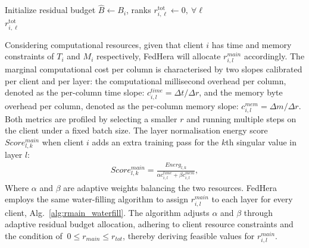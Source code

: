 \documentclass{article}
\begin{document}
\begin{algorithm}[tb]
\caption{Water-Filling for Download-side Rank Allocation $r^{\mathrm{tot}}_{i,\ell}$} \label{alg:rtot_waterfill}

Initialize residual budget $\widehat{B} \gets B_i$, ranks $r^{\mathrm{tot}}_{i,\ell} \gets 0,\ \forall \ell$ \\
\Return $r^{\mathrm{tot}}_{i,\ell}$
\end{algorithm}

Considering computational resources, given that client $i$ has time and memory constraints of $T_{i}$ and $M_{i}$ respectively, FedHera will allocate $r^{main}_{i, l}$ accordingly. The marginal computational cost per column is characterised by two slopes calibrated per client and per layer: the computational millisecond overhead per column, denoted as the per-column time slope: $c_{i,l}^{time} = \Delta t /\Delta r$, and the memory byte overhead per column, denoted as the per-column memory slope: $c_{i,l}^{mem} = \Delta m /\Delta r$. Both metrics are profiled by selecting a smaller $r$ and running multiple steps on the client under a fixed batch size. The layer normalisation energy score $Score_{l,k}^{main}$ when client $i$ adds an extra training pass for the $k$th singular value in layer $l$:
\begin{align}
    Score_{l,k}^{main} = \frac{Energ_{l, k}}{\alpha c_{i,l}^{time}+\beta c_{i,l}^{mem}},
\end{align}
Where $\alpha$ and $\beta$ are adaptive weights balancing the two resources. FedHera employs the same water-ﬁlling algorithm to assign $r^{main}_{i, l}$ to each layer for every client, Alg.~\ref{alg:rmain_waterfill}. The algorithm adjusts $\alpha$ and $\beta$ through adaptive residual budget allocation, adhering to client resource constraints and the condition of $\ 0 \leq r_{main} \leq r_{tot}$, thereby deriving feasible values for $r^{main}_{i, l}$.
\end{document}
